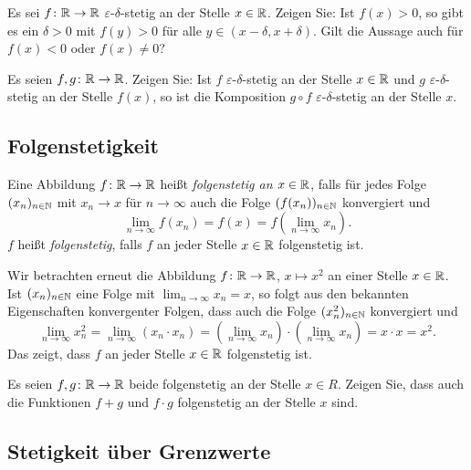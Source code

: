 \documentclass[a4paper,10pt]{article}
\begin{document}
\begin{question}
 Es sei $f \colon \mathbb{R} \to \mathbb{R}$ $\varepsilon$-$\delta$-stetig an der Stelle $x \in \mathbb{R}$. Zeigen Sie: Ist $f(x) > 0$, so gibt es ein $\delta > 0$ mit $f(y) > 0$ für alle $y \in (x-\delta, x+\delta)$. Gilt die Aussage auch für $f(x) < 0$ oder $f(x) \neq 0$?
\end{question}


\begin{question}
 Es seien $f, g \colon \mathbb{R} \to \mathbb{R}$. Zeigen Sie: Ist $f$ $\varepsilon$-$\delta$-stetig an der Stelle $x \in \mathbb{R}$ und $g$ $\varepsilon$-$\delta$-stetig an der Stelle $f(x)$, so ist die Komposition $g \circ f$ $\varepsilon$-$\delta$-stetig an der Stelle $x$.
\end{question}


\subsection{Folgenstetigkeit}


\begin{defi}
 Eine Abbildung $f \colon \mathbb{R} \to \mathbb{R}$ heißt \emph{folgenstetig an $x \in \mathbb{R}$}, falls für jedes Folge $(x_n)_{n \in \mathbb{N}}$ mit $x_n \to x$ für $n \to \infty$ auch die Folge $(f(x_n))_{n \in \mathbb{N}}$ konvergiert und
 \[
  \lim_{n \to \infty} f(x_n) = f(x) = f\left(\lim_{n \to \infty} x_n\right).
 \]
 $f$ heißt \emph{folgenstetig}, falls $f$ an jeder Stelle $x \in \mathbb{R}$ folgenstetig ist.
\end{defi}


\begin{bsp}
 Wir betrachten erneut die Abbildung $f \colon \mathbb{R} \to \mathbb{R}$, $x \mapsto x^2$ an einer Stelle $x \in \mathbb{R}$. Ist $(x_n)_{n \in \mathbb{N}}$ eine Folge mit $\lim_{n \to \infty} x_n = x$, so folgt aus den bekannten Eigenschaften konvergenter Folgen, dass auch die Folge $(x_n^2)_{n \in \mathbb{N}}$ konvergiert und
 \[
  \lim_{n \to \infty} x_n^2
  = \lim_{n \to \infty} (x_n \cdot x_n)
  = \left(\lim_{n \to \infty} x_n\right) \cdot \left(\lim_{n \to \infty} x_n\right)
  = x \cdot x
  = x^2.
 \]
 Das zeigt, dass $f$ an jeder Stelle $x \in \mathbb{R}$ folgenstetig ist.
\end{bsp}


\begin{question}
 Es seien $f, g \colon \mathbb{R} \to \mathbb{R}$ beide folgenstetig an der Stelle $x \in R$. Zeigen Sie, dass auch die Funktionen $f+g$ und $f \cdot g$ folgenstetig an der Stelle $x$ sind.
\end{question}


\subsection{Stetigkeit über Grenzwerte}
\end{document}
